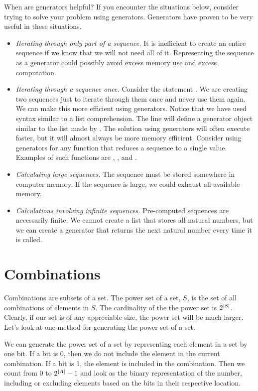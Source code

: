 When are generators helpful? If you encounter the situations below, consider trying to solve 
your problem using generators.  Generators have proven to be very useful in these situations.
\begin{itemize}
\item \emph{Iterating through only part of a sequence.}
It is inefficient to create an entire sequence if we know that we will not need all of it.
Representing the sequence as a generator could possibly avoid excess memory use and excess computation.
\item \emph{Iterating through a sequence once.} Consider the statement 
.
We are creating two sequences just to iterate through them once and never use them again.
We can make this more efficient using generators.
Notice that we have used syntax similar to a list comprehension.
The line  will define a generator object similar to the list made by \li{[i for i in xrange(1000) if i\%2 == 0]}.
The solution using generators will often execute faster, but it will almost always be more memory efficient.  Consider using generators for any function that reduces a sequence to a single value.  Examples of such functions are , , and .
\item \emph{Calculating large sequences.}  The sequence must be stored somewhere in computer memory.
If the sequence is large, we could exhaust all available memory.
\item \emph{Calculations involving infinite sequences.}  Pre-computed sequences are necessarily finite.  We cannot create a list that stores all natural numbers, but we can create a generator that returns the next natural number every time it is called.
\end{itemize}


\section*{Combinations}
Combinations are subsets of a set.  The power set of a set, $S$, is the set of all combinations
of elements in $S$.  The cardinality of the the power set is $2^{\left\lvert S\right\rvert}$.  Clearly, if our
set is of any appreciable size, the power set will be much larger.  Let's look at one method for
generating the power set of a set.

We can generate the power set of a set by representing each element in a set by one bit.
If a bit is 0, then we do not include the element in the current combination.  If a
bit is 1, the element is included in the combination.  Then we count from 0 to $2^{\left\lvert A\right\rvert}-1$
and look as the binary representation of the number, including or excluding elements based
on the bits in their respective location.

